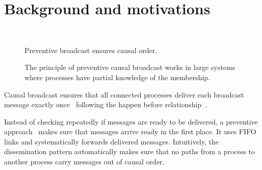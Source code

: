 
\section{Background and motivations}
\label{sec:motivations}

\begin{figure*}
  \begin{center}
    \hspace{40pt}
    \hspace{40pt}
    \\
    \hspace{40pt}
    \caption{\label{fig:generalsolve}Preventive broadcast ensures causal order.}
  \end{center}
\end{figure*}


\begin{figure*}
  \begin{center}
    
    \caption{\label{fig:disseminationtree}The principle of preventive causal
      broadcast works in large systems where processes have partial knowledge
      of the membership.}
  \end{center}
\end{figure*}

Causal broadcast ensures that all connected processes deliver each broadcast
message exactly once~\cite{hadzilacos1994modular} following the happen before
relationship~\cite{lamport1978time}.

Instead of checking repeatedly if messages are ready to be delivered, a
preventive approach~\cite{friedman2004causal} makes sure that messages arrive
ready in the first place.  It uses FIFO links and systematically forwards
delivered messages.  Intuitively, the dissemination pattern automatically makes
sure that no paths from a process to another process carry messages out of
causal order.

